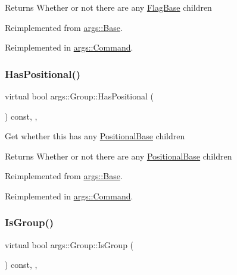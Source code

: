 \begin{DoxyReturn}{Returns}
Whether or not there are any \hyperlink{classargs_1_1_flag_base}{Flag\+Base} children 
\end{DoxyReturn}


Reimplemented from \hyperlink{classargs_1_1_base_a81684f399665c0372439c070af5de4a7}{args\+::\+Base}.



Reimplemented in \hyperlink{classargs_1_1_command_abcf9fafcb1531d3c0ea8a1b3a31c6ba4}{args\+::\+Command}.

\mbox{\label{classargs_1_1_group_a3d976f35f65ed8e4908eb88ce84accd4}} 
\subsubsection{\texorpdfstring{Has\+Positional()}{HasPositional()}}
{\footnotesize\ttfamily virtual bool args\+::\+Group\+::\+Has\+Positional (\begin{DoxyParamCaption}{ }\end{DoxyParamCaption}) const\hspace{0.3cm}{\ttfamily [inline]}, {\ttfamily [override]}, {\ttfamily [virtual]}}

Get whether this has any \hyperlink{classargs_1_1_positional_base}{Positional\+Base} children

\begin{DoxyReturn}{Returns}
Whether or not there are any \hyperlink{classargs_1_1_positional_base}{Positional\+Base} children 
\end{DoxyReturn}


Reimplemented from \hyperlink{classargs_1_1_base_a3825f4afe867335438103a0d45ced9f7}{args\+::\+Base}.



Reimplemented in \hyperlink{classargs_1_1_command_a5c430c5f36d678e80420d2f094ac3a4d}{args\+::\+Command}.

\mbox{\label{classargs_1_1_group_a60de0a1db5be506a8638af0d3ce329bc}} 
\subsubsection{\texorpdfstring{Is\+Group()}{IsGroup()}}
{\footnotesize\ttfamily virtual bool args\+::\+Group\+::\+Is\+Group (\begin{DoxyParamCaption}{ }\end{DoxyParamCaption}) const\hspace{0.3cm}{\ttfamily [inline]}, {\ttfamily [override]}, {\ttfamily [virtual]}}



